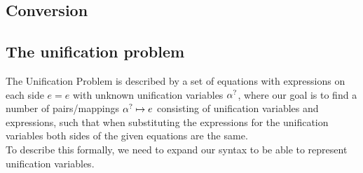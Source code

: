 \documentclass[twoside,12pt,a4paper]{article}
\begin{document}
\begin{definition}
    
\end{definition}


\begin{definition}[Substitution]
    
\end{definition}


\begin{definition}
    
\end{definition}


\begin{definition}
    
\end{definition}


\begin{definition}
    
\end{definition}

\subsection{Conversion}


\begin{definition}
    
\end{definition}

\begin{definition}
    
\end{definition}


\subsection{The unification problem}

The Unification Problem is described by a set of equations with expressions on each side $e=e$ with unknown unification variables $\alpha^?$,
where our goal is to find a number of pairs/mappings $\alpha^? \mapsto e$ consisting of unification variables and expressions, 
such that when substituting the expressions for the unification variables both sides of the 
given equations are the same. %
\\
To describe this formally, we need to expand our syntax to be able to represent unification variables.
\end{document}
